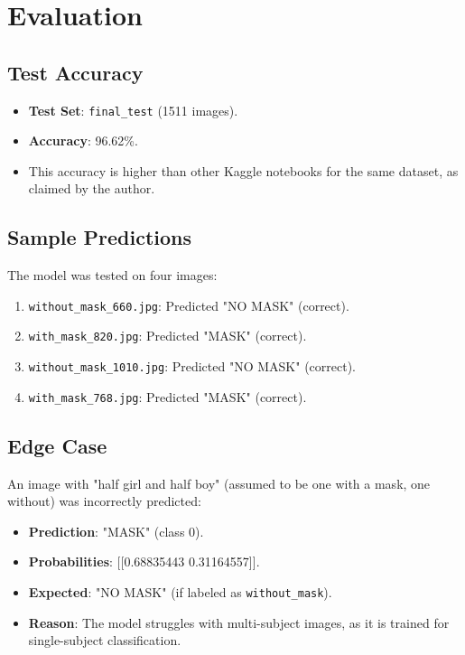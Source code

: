 \documentclass[a4paper,12pt]{article}
\begin{document}
\section{Evaluation}
\subsection{Test Accuracy}
\begin{itemize}
    \item \textbf{Test Set}: \texttt{final\_test} (1511 images).
    \item \textbf{Accuracy}: 96.62\%.
    \item This accuracy is higher than other Kaggle notebooks for the same dataset, as claimed by the author.
\end{itemize}

\subsection{Sample Predictions}
The model was tested on four images:
\begin{enumerate}
    \item \texttt{without\_mask\_660.jpg}: Predicted "NO MASK" (correct).
    \item \texttt{with\_mask\_820.jpg}: Predicted "MASK" (correct).
    \item \texttt{without\_mask\_1010.jpg}: Predicted "NO MASK" (correct).
    \item \texttt{with\_mask\_768.jpg}: Predicted "MASK" (correct).
\end{enumerate}

\subsection{Edge Case}
An image with "half girl and half boy" (assumed to be one with a mask, one without) was incorrectly predicted:
\begin{itemize}
    \item \textbf{Prediction}: "MASK" (class 0).
    \item \textbf{Probabilities}: [[0.68835443 0.31164557]].
    \item \textbf{Expected}: "NO MASK" (if labeled as \texttt{without\_mask}).
    \item \textbf{Reason}: The model struggles with multi-subject images, as it is trained for single-subject classification.
\end{itemize}
\end{document}
